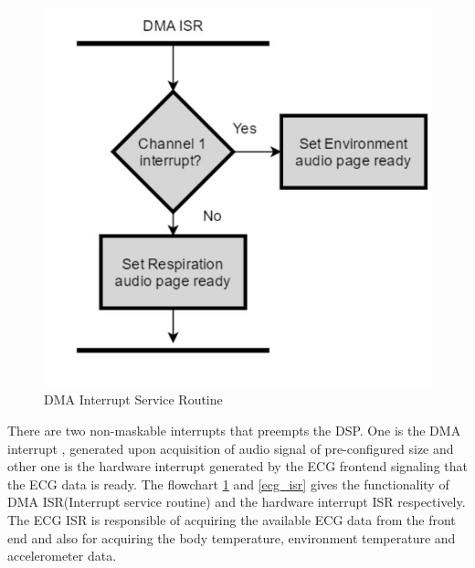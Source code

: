  \begin{figure}[h]
	\centering
	\includegraphics[scale = 0.5 ]{dma_interrupt.JPG}
	\caption{DMA Interrupt Service Routine\label{dma_isr}}
\end{figure}

\hspace{10mm} There are two non-maskable interrupts that preempts the DSP. One is the DMA interrupt , generated upon acquisition of audio signal of pre-configured size  and other one is the hardware interrupt  generated by the ECG frontend signaling that the ECG data is ready. The flowchart \ref{dma_isr} and \ref{ecg_isr} gives the functionality of DMA ISR(Interrupt service routine) and  the hardware interrupt ISR respectively. The ECG ISR is responsible of acquiring the available ECG data from the front end and also for acquiring the body temperature, environment temperature and accelerometer data.

